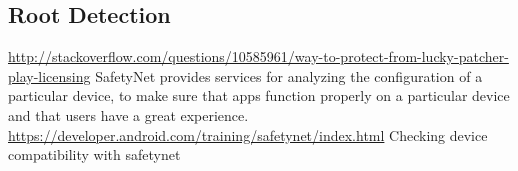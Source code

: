 \subsection{Root Detection}\label{subsection:tampering-root}
\url{http://stackoverflow.com/questions/10585961/way-to-protect-from-lucky-patcher-play-licensing}\newline
SafetyNet provides services for analyzing the configuration of a particular device, to make sure that apps function properly on a particular device and that users have a great experience. \url{https://developer.android.com/training/safetynet/index.html} Checking device compatibility with safetynet\newline
